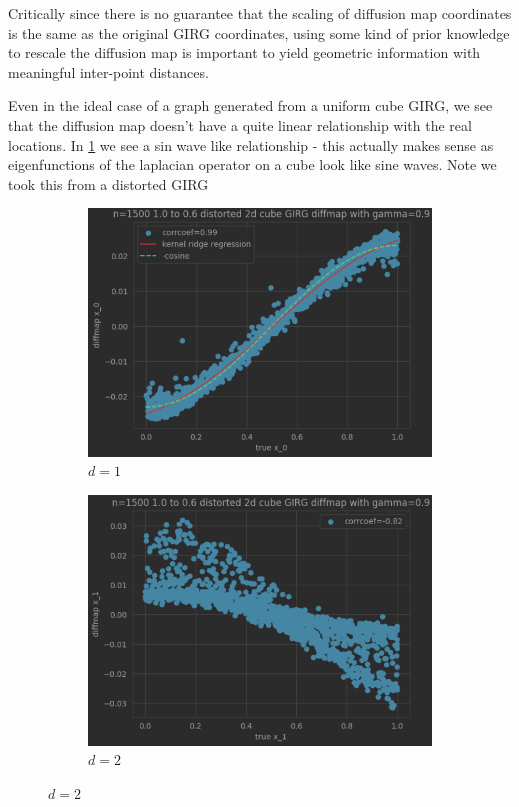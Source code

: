Critically since there is no guarantee that the scaling of diffusion map coordinates is the same as the original GIRG coordinates, using some kind of prior knowledge to rescale the diffusion map is important to yield geometric information with meaningful inter-point distances.

Even in the ideal case of a graph generated from a uniform cube GIRG, we see that the diffusion map doesn't have a quite linear relationship with the real locations. In \cref{fig:2d_distorted_major} we see a sin wave like relationship - this actually makes sense as eigenfunctions of the laplacian operator on a cube look like sine waves. Note we took this from a distorted GIRG 

\begin{figure}
  \centering

  \begin{subfigure}{0.49\textwidth}
    \centering
    \includegraphics[width=\linewidth]{figures/2d_distorted_diffmap_plot_major.png}
    \caption{$d=1$}
    \label{fig:2d_distorted_major}
  \end{subfigure}
  \hfill
  \begin{subfigure}{0.49\textwidth}
    \centering
    \includegraphics[width=\linewidth]{figures/2d_distorted_diffmap_plot_minor.png}
    \caption{$d=2$}
    \label{fig:2d_distorted_minor}
  \end{subfigure}



\end{figure}
